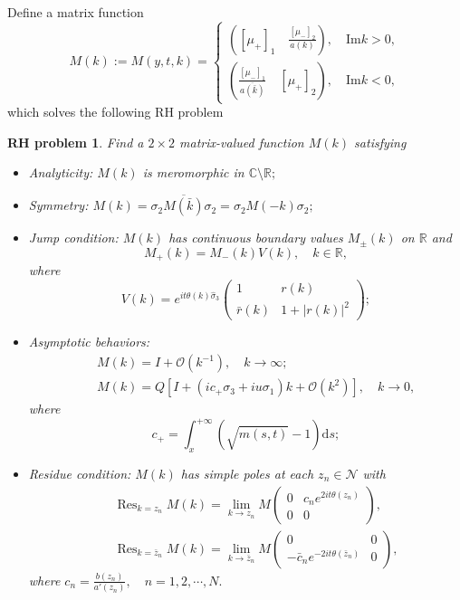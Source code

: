 \documentclass[11pt]{article}
\numberwithin{equation}{section}
\newtheorem{RHP}{RH problem}
\DeclareMathOperator*{\res}{Res}
\begin{document}
Define a matrix function
\begin{equation}
M(k):=M(y,t,k)=\left\{\begin{array}{lr}
\left(\left[\mu_+\right]_1\quad \frac{\left[\mu_-\right]_2}{a\left(k\right)}\right),\quad \mathrm{Im}k>0,\\
\left(\frac{\left[\mu_-\right]_1}{\overline{a(\bar{k})}} \quad \left[\mu_+\right]_2 \right),\quad \mathrm{Im}k<0,\end{array}
\right.
\end{equation}
which solves the following RH problem
\begin{RHP}\label{rhp1}
Find a $2\times 2$ matrix-valued function $M(k)$ satisfying \begin{itemize}
             \item Analyticity: $M(k)$ is meromorphic in $\mathbb{C}\setminus\mathbb{R};$
             \item Symmetry: $M(k)=\sigma_2 \overline{ M(\bar{k})}\sigma_2=\sigma_2 M(-k)\sigma_2;$
             \item Jump condition: $M(k)$ has continuous boundary values $M_{\pm}(k)$ on $\mathbb{R}$ and
\begin{equation}
M_+(k)=M_-(k)V(k),\quad k\in \mathbb{R},
\end{equation}
where
\begin{equation}
V(k)=e^{it\theta(k)\hat{\sigma}_3}\left(\begin{array}{cc}
1&r(k)\\\bar{r}(k)&1+|r(k)|^2\end{array}\right);
\end{equation}
\item Asymptotic behaviors:
\begin{eqnarray}
&&M(k)=I+\mathcal{O}(k^{-1}),\quad k\to \infty;\nonumber\\
&&M(k)=Q\left[I+(ic_+\sigma_3+iu\sigma_1)k+\mathcal{O}(k^2)\right],\quad k\to 0,
\end{eqnarray}
where
{\begin{equation}
c_+=\int_x^{+\infty}\left(\sqrt{m(s,t)}-1\right)\mathrm{d}s;
\end{equation}}
\item
Residue condition: $M(k)$ has simple poles at each $z_n\in\mathcal{N}$ with
\begin{eqnarray}
&&\res_{k=z_n}M(k)=\lim_{k\to z_n}M\left(\begin{array}{cc}
0&c_ne^{2it\theta(z_n)}\\0&0\end{array}\right),\\
&&\res_{k=\bar{z}_n}M(k)=\lim_{k\to\bar{z}_n}M\left(\begin{array}{cc}
0&0\\-\bar{c}_ne^{-2it\theta(\bar{z}_n)}&0\end{array}\right),
\end{eqnarray}
where $c_n=\frac{b(z_n)}{a'(z_n)},\quad n=1,2,\cdots,N.$
           \end{itemize}
\end{RHP}
\end{document}
